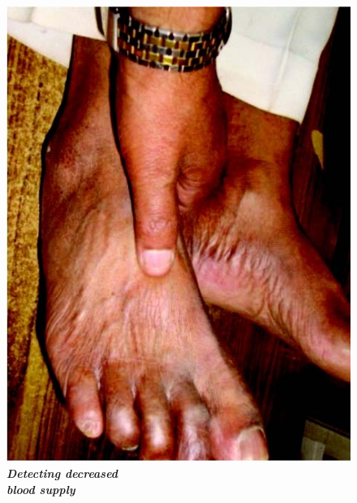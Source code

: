 \begin{figure}[h]
\centering
\includegraphics[scale=.6]{images/064.jpg}\\
\textbf{\textit{Detecting decreased\\ blood supply}}
\end{figure}

